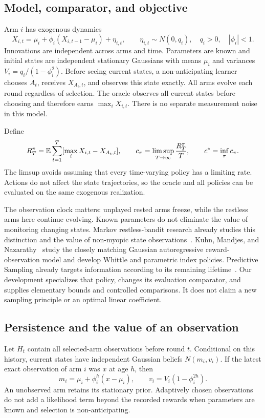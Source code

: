 \subsection{Model, comparator, and objective}
Arm $i$ has exogenous dynamics
\begin{equation}
X_{i,t}=\mu_i+\phi_i(X_{i,t-1}-\mu_i)+\eta_{i,t},\qquad
\eta_{i,t}\sim N(0,q_i),\quad q_i>0,\quad |\phi_i|<1.
\label{predictive_ar1:eq:model}
\end{equation}
Innovations are independent across arms and time. Parameters are known and initial states are independent stationary Gaussians with means $\mu_i$ and variances $V_i=q_i/(1-\phi_i^2)$. Before seeing current states, a non-anticipating learner chooses $A_t$, receives $X_{A_t,t}$, and observes this state exactly. All arms evolve each round regardless of selection. The oracle observes all current states before choosing and therefore earns $\max_iX_{i,t}$. There is no separate measurement noise in this model.

Define
\begin{equation}
R_T^\pi=\mathbb E\sum_{t=1}^T[\max_iX_{i,t}-X_{A_t,t}],\qquad
c_\pi=\limsup_{T\to\infty}\frac{R_T^\pi}{T},\qquad
c^*=\inf_\pi c_\pi.
\end{equation}
The limsup avoids assuming that every time-varying policy has a limiting rate. Actions do not affect the state trajectories, so the oracle and all policies can be evaluated on the same exogenous realization.

The observation clock matters: unplayed rested arms freeze, while the restless arms here continue evolving. Known parameters do not eliminate the value of monitoring changing states. Markov restless-bandit research already studies this distinction and the value of non-myopic state observations~\cite{collected29}. Kuhn, Mandjes, and Nazarathy~\cite{collected28} study the closely matching Gaussian autoregressive reward-observation model and develop Whittle and parametric index policies. Predictive Sampling already targets information according to its remaining lifetime~\cite{collected10}. Our development specializes that policy, changes its evaluation comparator, and supplies elementary bounds and controlled comparisons. It does not claim a new sampling principle or an optimal linear coefficient.

\subsection{Persistence and the value of an observation}
Let $H_t$ contain all selected-arm observations before round $t$. Conditional on this history, current states have independent Gaussian beliefs $N(m_i,v_i)$. If the latest exact observation of arm $i$ was $x$ at age $h$, then
\begin{equation}
m_i=\mu_i+\phi_i^h(x-\mu_i),\qquad
v_i=V_i(1-\phi_i^{2h}).
\label{predictive_ar1:eq:belief}
\end{equation}
An unobserved arm retains its stationary prior. Adaptively chosen observations do not add a likelihood term beyond the recorded rewards when parameters are known and selection is non-anticipating.

